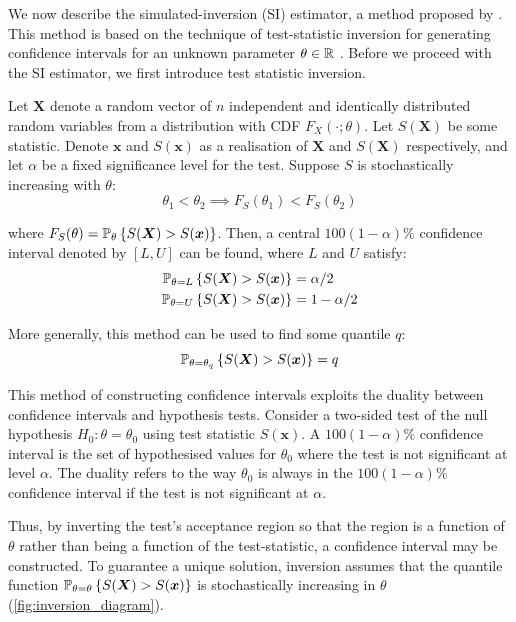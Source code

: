 We now describe the simulated-inversion (SI) estimator, a method proposed by \citet{Huang2019}. This method is based on the technique of test-statistic inversion for generating confidence intervals for an unknown parameter $\theta \in \mathbb{R}$ \cite{Carpenter1999}. Before we proceed with the SI estimator, we first introduce test statistic inversion.

Let $\bm{X}$ denote a random vector of $n$ independent and identically distributed random variables from a distribution with CDF $F_X (\cdot; \theta)$. Let $S(\bm{X})$ be some statistic. Denote $\bm{x}$ and $S(\bm{x})$ as a realisation of $\bm{X}$ and $S(\bm{X})$ respectively, and let $\alpha$ be a fixed significance level for the test. Suppose $S$ is stochastically increasing with $\theta$:
\begin{equation}
    \theta_1 < \theta_2 \implies F_S(\theta_1) < F_S(\theta_2) 
\end{equation}

where $F_S(\theta) = \mathbb{P}_\theta\left\{S(\bm{X}) > S(\bm{x})\right\}$. Then, a central $100(1-\alpha)\%$ confidence interval denoted by $[L, U]$ can be found, where $L$ and $U$ satisfy: \begin{equation}
\begin{aligned}
    \mathbb{P}_{\theta = L}\left\{S(\bm{X}) > S(\bm{x})\right\} &= \alpha/2 \\
    \mathbb{P}_{\theta = U}\left\{S(\bm{X}) > S(\bm{x})\right\} &= 1 - \alpha/2
\end{aligned}
\end{equation}

More generally, this method can be used to find some quantile $q$: \begin{equation}\label{eq: inversion}
    \mathbb{P}_{\theta = \theta_q}\left\{S(\bm{X}) > S(\bm{x})\right\} = q
\end{equation}

This method of constructing confidence intervals exploits the duality between confidence intervals and hypothesis tests. Consider a two-sided test of the null hypothesis $H_0: \theta = \theta_0$ using test statistic $S(\bm{x})$. A $100(1-\alpha)\%$ confidence interval is the set of hypothesised values for $\theta_0$ where the test is not significant at level $\alpha$. The duality refers to the way $\theta_0$ is always in the $100(1-\alpha)\%$ confidence interval if the test is not significant at $\alpha$.

Thus, by inverting the test's acceptance region so that the region is a function of $\theta$ rather than being a function of the test-statistic, a confidence interval may be constructed. To guarantee a unique solution, inversion assumes that the quantile function $\mathbb{P}_{\theta = \theta}\left\{S(\bm{X}) > S(\bm{x})\right\}$ is stochastically increasing in $\theta$ (\autoref{fig:inversion_diagram}).


